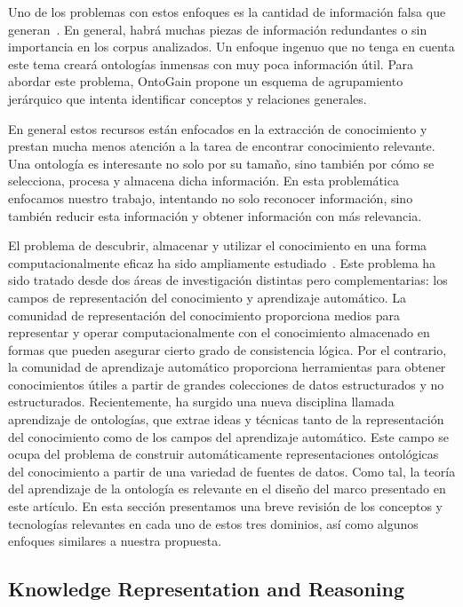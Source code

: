 Uno de los problemas con estos enfoques es la cantidad de información falsa que generan~\cite{Maimon:2015:OLT:2870689.2870690}. En general, habrá muchas piezas de información redundantes o sin importancia en los corpus analizados. Un enfoque ingenuo que no tenga en cuenta este tema creará ontologías inmensas con muy poca información útil. Para abordar este problema, OntoGain propone un esquema de agrupamiento jerárquico que intenta identificar conceptos y relaciones generales.

En general estos recursos están enfocados en la extracción de conocimiento y prestan mucha menos atención a la tarea de encontrar conocimiento relevante. Una ontología es interesante no solo por su tamaño, sino también por cómo se selecciona, procesa y almacena dicha información. En esta problemática enfocamos nuestro trabajo, intentando no solo reconocer información, sino también reducir esta información y obtener información con más relevancia.

El problema de descubrir, almacenar y utilizar el conocimiento en una forma computacionalmente eficaz ha sido ampliamente estudiado~\cite{mitchell2015never, ROSPOCHER2016132, cimiano2009ontology}. Este problema ha sido tratado desde dos áreas de investigación distintas pero complementarias: los campos de representación del conocimiento y aprendizaje automático. La comunidad de representación del conocimiento proporciona medios para representar y operar computacionalmente con el conocimiento almacenado en formas que pueden asegurar cierto grado de consistencia lógica. Por el contrario, la comunidad de aprendizaje automático proporciona herramientas para obtener conocimientos útiles a partir de grandes colecciones de datos estructurados y no estructurados. Recientemente, ha surgido una nueva disciplina llamada aprendizaje de ontologías, que extrae ideas y técnicas tanto de la representación del conocimiento como de los campos del aprendizaje automático. Este campo se ocupa del problema de construir automáticamente representaciones ontológicas del conocimiento a partir de una variedad de fuentes de datos. Como tal, la teoría del aprendizaje de la ontología es relevante en el diseño del marco presentado en este artículo. En esta sección presentamos una breve revisión de los conceptos y tecnologías relevantes en cada uno de estos tres dominios, así como algunos enfoques similares a nuestra propuesta.

\subsection{Knowledge Representation and Reasoning}

